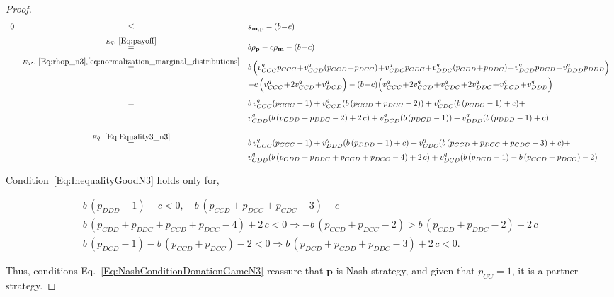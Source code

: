 \documentclass{article}
\theoremstyle{definition}
\begin{document}
\begin{proof}
\begin{equation}\label{Eq:InequalityGoodN3}
\begin{array}{rcl}
0 &\le	&s_{\mathbf{m}, \mathbf{p}}-(b\!-\!c)\\[0.2cm]
	&\stackrel{Eq.~\eqref{Eq:payoff}}{=}	&b\rho_\mathbf{p} - c\rho_\mathbf{m}-(b\!-\!c)\\[0.2cm]
	&\stackrel{Eqs.~\eqref{Eq:rhop_n3}, \eqref{eq:normalization_marginal_distributions}}{=}	& 
  b\,\Big( v^q_{CCC} p_{CCC} \!+\!  v^q_{CCD}(p_{CCD}\!+\!p_{DCC}) \!+\! v^q_{CDC} p_{CDC} \!+\! v^q_{DDC}(p_{CDD}\!+\!p_{DDC}) \!+\! v^q_{DCD} p_{DCD} \!+\! v^q_{DDD} p_{DDD}\Big) \\ [0.2cm]
  & & - c\,\Big(v^q_{CCC} \!+\! 2 v^q_{CCD} \!+\! v^q_{DCD}\Big) - (b\!-\!c)\Big(v^q_{CCC} \!+\! 2 v^q_{CCD} \!+\! v^q_{CDC} \!+\! 2 v^q_{DDC} \!+\! v^q_{DCD} \!+\! v^q_{DDD} \Big) \\ [0.4cm]
  & = & b\, v^q_{CCC} (p_{CCC} - 1) + v^q_{CCD} (b\, (p_{CCD} + p_{DCC} - 2)) + v^q_{CDC} (b\, (p_{CDC} - 1) + c) + \\ [0.2cm]
  & & v^q_{CDD} (b\, (p_{CDD} + p_{DDC} - 2) + 2\, c) + v^q_{DCD} (b\, (p _{DCD} - 1)) + v^q_{DDD} (b\, (p _{DDD} - 1) + c) \\ [0.4cm]
  &\stackrel{Eq.~\eqref{Eq:Equality3_n3}}{=}	& b\, v^q_{CCC} (p_{CCC} - 1) + v^q_{DDD} (b\, (p _{DDD} - 1) + c) + v^q_{CDC} (b\, (p_{CCD} + p_{DCC} + p_{CDC}- 3) + c) + \\ [0.2cm]
  & & v^q_{CDD} (b\, (p_{CDD} + p_{DDC} + p_{CCD} + p_{DCC} - 4) + 2\, c) + v^q_{DCD} (b\, (p _{DCD}  - 1) -  b\, (p_{CCD} + p_{DCC}) - 2)
\end{array}
\end{equation}

Condition~\eqref{Eq:InequalityGoodN3} holds only for,

\begin{equation*}
\begin{array}{c}
b\, (p _{DDD} - 1) + c < 0,  \quad b\, (p_{CCD} + p_{DCC} + p_{CDC}- 3) + c \\ [0.4cm]
b\, (p_{CDD} + p_{DDC} + p_{CCD} + p_{DCC} - 4) + 2\, c < 0 \Rightarrow - b\, (p_{CCD} + p_{DCC} - 2) > b\, (p_{CDD} + p_{DDC} - 2) + 2\, c \\ [0.4cm]
b\, (p _{DCD}  - 1) -  b\, (p_{CCD} + p_{DCC}) - 2 < 0 \Rightarrow  b\, (p _{DCD} + p_{CDD} + p_{DDC} - 3) + 2\, c < 0.
\end{array}
\end{equation*}

Thus, conditions Eq.~\eqref{Eq:NashConditionDonationGameN3} reassure that
$\mathbf{p}$ is Nash strategy, and given that $p_{CC} = 1$, it is a partner
strategy.


\end{proof}
\end{document}
